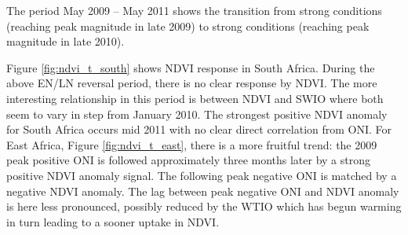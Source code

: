 The period May 2009 -- May 2011 shows the transition from strong \elnino{}
conditions (reaching peak magnitude in late 2009) to strong \nina{} conditions
(reaching peak magnitude in late 2010).

Figure \ref{fig:ndvi_t_south} shows NDVI response in South Africa. During the
above EN/LN reversal period, there is no clear response by NDVI. The more
interesting relationship in this period is between NDVI and SWIO where both seem
to vary in step from January 2010. The strongest positive NDVI anomaly for South
Africa occurs mid 2011 with no clear direct correlation from ONI. For East
Africa, Figure \ref{fig:ndvi_t_east}, there is a more fruitful trend: the 2009
peak positive ONI is followed approximately three months later by a strong
positive NDVI anomaly signal. The following peak negative ONI is matched by a
negative NDVI anomaly. The lag between peak negative ONI and NDVI anomaly is
here less pronounced, possibly reduced by the WTIO which has begun warming in
turn leading to a sooner uptake in NDVI.


